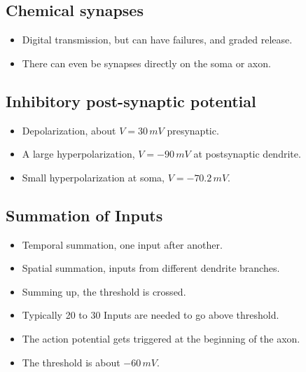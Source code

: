 \documentclass[main]{subfiles}
\begin{document}
\begin{figure}[H]
	\centering
\end{figure}

\subsection{Chemical synapses}
\begin{figure}[H]
	\centering
\end{figure}
\begin{itemize}[noitemsep,nolistsep]
	\item Digital transmission, but can have failures, and graded release.
	\item There can even be synapses directly on the soma or axon.
\end{itemize}

\subsection{Inhibitory post-synaptic potential}
\begin{itemize}[noitemsep,nolistsep]
	\item Depolarization, about $V=30\,mV$ presynaptic.
	\item A large hyperpolarization, $V=-90\,mV$ at postsynaptic dendrite.
	\item Small hyperpolarization at soma, $V=-70.2\,mV$.
\end{itemize}

\subsection{Summation of Inputs}
\begin{itemize}[noitemsep,nolistsep]
	\item Temporal summation, one input after another.
	\item Spatial summation, inputs from different dendrite branches.
	\item Summing up, the threshold is crossed.
	\item Typically 20 to 30 Inputs are needed to go above threshold.
	\item The action potential gets triggered at the beginning of the axon.
	\item The threshold is about $-60\,mV$.
\end{itemize}
\end{document}
